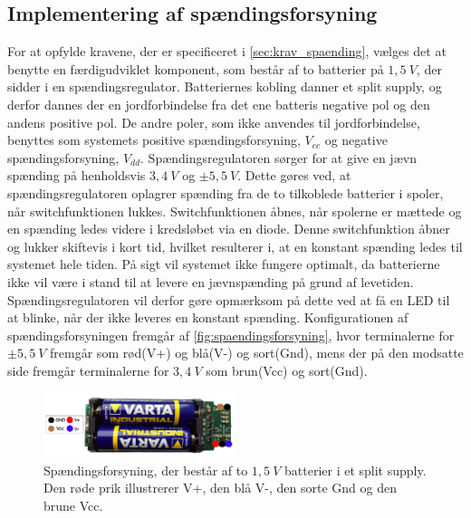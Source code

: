 \subsection{Implementering af spændingsforsyning}
For at opfylde kravene, der er specificeret i \autoref{sec:krav_spaending}, vælges det at benytte en færdigudviklet komponent, som består af to batterier på $1,5~V$, der sidder i en spændingsregulator. Batteriernes kobling danner et split supply, og derfor dannes der en jordforbindelse fra det ene batteris negative pol og den andens positive pol. De andre poler, som ikke anvendes til jordforbindelse, benyttes som systemets positive spændingsforsyning, ${V}_{cc}$ og negative spændingsforsyning, ${V}_{dd}$.
Spændingsregulatoren sørger for at give en jævn spænding på henholdsvis $3,4~V$ og $\pm 5,5~V$. Dette gøres ved, at spændingsregulatoren oplagrer spænding fra de to tilkoblede batterier i spoler, når switchfunktionen lukkes. Switchfunktionen åbnes, når spolerne er mættede og en spænding ledes videre i kredsløbet via en diode. Denne switchfunktion åbner og lukker skiftevis i kort tid, hvilket resulterer i, at en konstant spænding ledes til systemet hele tiden. På sigt vil systemet ikke fungere optimalt, da batterierne ikke vil være i stand til at levere en jævnspænding på grund af levetiden. Spændingsregulatoren vil derfor gøre opmærksom på dette ved at få en LED til at blinke, når der ikke leveres en konstant spænding. 
Konfigurationen af spændingsforsyningen fremgår af \autoref{fig:spaendingsforsyning}, hvor terminalerne for $\pm 5,5~V$ fremgår som rød(V+) og blå(V-) og sort(Gnd), mens der på den modsatte side fremgår terminalerne for $3,4~V$ som brun(Vcc) og sort(Gnd). 

\begin{figure}[H]
\centering
\includegraphics[width=0.5\textwidth]{figures/spaendingsforsyning}
\caption{Spændingsforsyning, der består af to $1,5~V$ batterier i et split supply. Den røde prik illustrerer V+, den blå V-, den sorte Gnd og den brune Vcc.}
\label{fig:spaendingsforsyning}
\end{figure}


